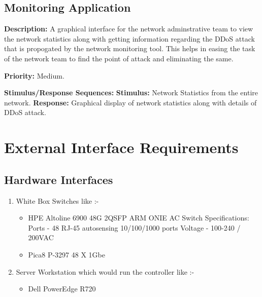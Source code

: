 \documentclass[12pt,a4paper,final]{report}
\begin{document}
\subsection{Monitoring Application}
\textbf{Description: }
\newline
A graphical interface for the network adminstrative team to view the network statistics along with getting information regarding the DDoS attack that is propogated by the network monitoring tool.
This helps in easing the task of the network team to find the point of attack and eliminating the same.
\newline

\noindent
\textbf{Priority: } Medium.
\newline

\noindent
\textbf{Stimulus/Response Sequences: }\newline
\textbf{Stimulus: } Network Statistics from the entire network. 
\newline
\textbf{Response: } Graphical display of network statistics along with details of DDoS attack.
\newline

\section{External Interface Requirements}
\subsection{Hardware Interfaces}
\begin{enumerate}
\item 
White Box Switches like :-
\begin{itemize}
\item HPE Altoline 6900 48G 2QSFP ARM ONIE AC Switch
\newline
Specifications:
\newline
Ports - 48 RJ-45 autosensing 10/100/1000 ports
\newline
Voltage - 100-240 / 200VAC

\item
Pica8 P-3297 48 X 1Gbe
\end{itemize}

\item
Server Workstation which would run the controller like :-
\begin{itemize}
\item
Dell PowerEdge R720
\end{itemize}
\end{enumerate}
\end{document}
